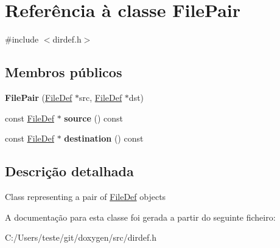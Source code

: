 \hypertarget{class_file_pair}{\section{Referência à classe File\-Pair}
\label{class_file_pair}
}


{\ttfamily \#include $<$dirdef.\-h$>$}

\subsection*{Membros públicos}
\begin{DoxyCompactItemize}
\item 
\hypertarget{class_file_pair_a2d07052e3513f9f38f743d70efa6de07}{{\bfseries File\-Pair} (\hyperlink{class_file_def}{File\-Def} $\ast$src, \hyperlink{class_file_def}{File\-Def} $\ast$dst)}\label{class_file_pair_a2d07052e3513f9f38f743d70efa6de07}

\item 
\hypertarget{class_file_pair_ac85853cc8ce296e863d9d5ed65b3e48a}{const \hyperlink{class_file_def}{File\-Def} $\ast$ {\bfseries source} () const }\label{class_file_pair_ac85853cc8ce296e863d9d5ed65b3e48a}

\item 
\hypertarget{class_file_pair_aa9b344a0b5fac1205cf3604cfa0e8735}{const \hyperlink{class_file_def}{File\-Def} $\ast$ {\bfseries destination} () const }\label{class_file_pair_aa9b344a0b5fac1205cf3604cfa0e8735}

\end{DoxyCompactItemize}


\subsection{Descrição detalhada}
Class representing a pair of \hyperlink{class_file_def}{File\-Def} objects 

A documentação para esta classe foi gerada a partir do seguinte ficheiro\-:\begin{DoxyCompactItemize}
\item 
C\-:/\-Users/teste/git/doxygen/src/dirdef.\-h\end{DoxyCompactItemize}
